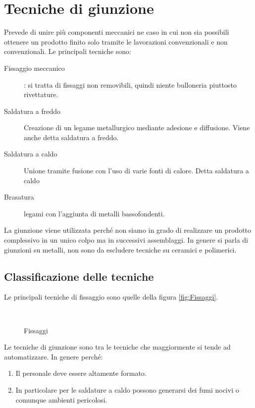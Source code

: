 
\chapter{Tecniche di giunzione}\label{chp:Giunzione}
Prevede di unire più componenti meccanici ne caso in cui non sia possibili ottenere un prodotto finito solo tramite le lavorazioni convenzionali e non convenzionali.
Le principali tecniche sono:
\begin{description}
\item[Fissaggio meccanico]: si tratta di fissaggi non removibili, quindi niente bulloneria piuttosto rivettature.
\item[Saldatura a freddo] Creazione di un legame metallurgico mediante adesione e diffusione.
Viene anche detta saldatura a freddo.
\item[Saldatura a caldo] Unione tramite fusione con l'uso di varie fonti di calore. Detta saldatura a caldo
\item[Brasatura] legami con l'aggiunta di metalli bassofondenti.
\end{description}

La giunzione viene utilizzata perché non siamo in grado di realizzare un prodotto complessivo in un unico colpo ma in successivi assemblaggi.
In genere si parla di giunzioni su metalli, non sono da escludere tecniche su ceramici e polimerici.

\section{Classificazione delle tecniche}
Le principali tecniche di fissaggio sono quelle della figura \ref{fig:Fissaggi}.

\begin{figure}
\centering
{}\\
\caption{Fissaggi}
\label{fig:TipiFissagi}
\end{figure}

Le tecniche di giunzione sono tra le tecniche che maggiormente si tende ad automatizzare.
In genere perché:
\begin{enumerate}
\item Il personale deve essere altamente formato.
\item In particolare per le saldature a caldo possono generarsi dei fumi nocivi o comunque ambienti pericolosi.
\end{enumerate}

